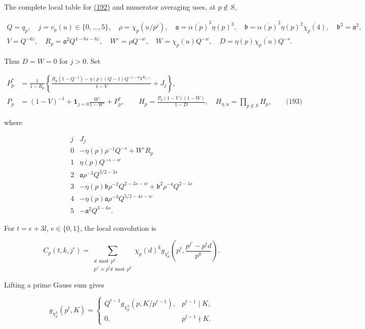 The complete local table for \protect\hyperlink{dr:Poisson}{(192)} and numerator averaging uses, at \(p\notin S\),

\[
\begin{gathered}
 Q=q_p,\quad j=v_p(u)\in\{0,\ldots,5\},\quad
 \rho=\chi_p(u/p^j),\quad
 \mathfrak a=\overline{\alpha(p)}^3\eta(p)^3,\quad
 \mathfrak b=\overline{\alpha(p)}^2\eta(p)^2\overline{\chi_p(4)},
 \quad \mathfrak b^3=\mathfrak a^2,\\
 V=Q^{-6z},\quad R_p=\mathfrak a^2Q^{4-6s-6z},\quad
 W^\circ=\rho Q^{-w},\quad W=\chi_p(u)Q^{-w},\quad
 D=\eta(p)\overline{\chi_p(u)}Q^{-s}.
\end{gathered}
\]

Thus \(D=W=0\) for \(j>0\). Set

\hypertarget{dr:Euler-table}{}

\label{dr:Euler-table}

\[
\begin{aligned}
 P_p^*&=\frac1{1-R_p}
 \left\{\frac{R_p(1-Q^{-1})-\eta(p)(Q-1)Q^{-s-w}
 V^{\mathbf1_{j\le1}}}{1-V}+J_j\right\},\\
 P_p&=(1-V)^{-1}+\mathbf1_{j=0}\frac{W^\circ}{1-W^\circ}+P_p^*,
 \qquad H_p=\frac{P_p(1-V)(1-W)}{1-D},
 \quad H_{\eta,u}=\prod_{p\notin S}H_p,
 \qquad\text{(193)}
\end{aligned}
\]

where

\[
\begin{array}{c|l}
 j&J_j\\ \hline
0&-\eta(p)\rho^{-1}Q^{-s}+W^\circ R_p\\
1&\eta(p)Q^{-s-w}\\
2&\mathfrak a\rho^{-3}Q^{3/2-3s}\\
3&-\eta(p)\mathfrak b\rho^{-2}Q^{2-3s-w}
                  +\mathfrak b^2\rho^{-4}Q^{2-4s}\\
4&-\eta(p)\mathfrak a\rho^{-3}Q^{5/2-4s-w}\\
5&-\mathfrak a^2Q^{3-6s}.
\end{array}
\]

For \(t=e+3l\), \(e\in\{0,1\}\), the local convolution is

\[
C_p(t,k,j')=\sum_{\substack{d\bmod p^k\\p^{j'}\equiv p^td\bmod p^k}}
 \chi_p(d)^k g_{\chi_p^t}
 \left(p^t,\frac{p^{j'}-p^td}{p^k}\right).
\]

Lifting a prime Gauss sum gives

\[
g_{\chi_p^h}(p^t,K)=
 \begin{cases}Q^{t-1}g_{\chi_p^h}(p,K/p^{t-1}),&p^{t-1}\mid K,\\
 0,&p^{t-1}\nmid K.
 \end{cases}
\]

